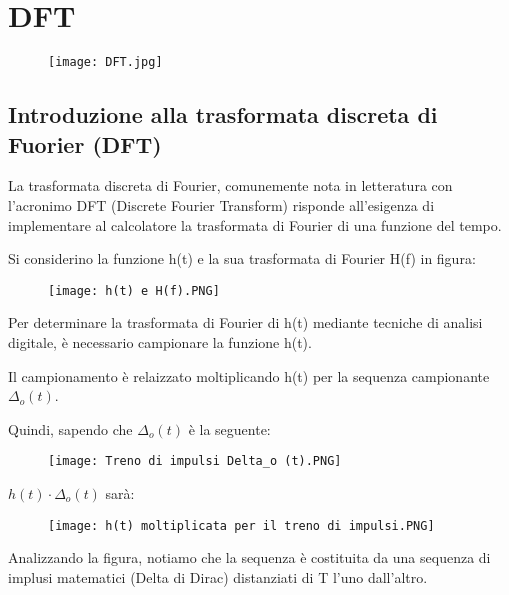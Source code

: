 \chapter{DFT} 

\begin{figure}[h]
    \centering
    \texttt{[image: DFT.jpg]}
\end{figure}  

\newpage 

\section{Introduzione alla trasformata discreta di Fuorier (DFT)}

La trasformata discreta di Fourier, comunemente nota in letteratura con l'acronimo DFT (Discrete Fourier Transform) 
risponde all'esigenza di implementare al calcolatore la trasformata di Fourier di una funzione del tempo. \newline 

Si considerino la funzione h(t) e la sua trasformata di Fourier H(f) in figura: 

\begin{figure}[h]
    \centering
    \texttt{[image: h(t) e H(f).PNG]}
\end{figure} 

Per determinare la trasformata di Fourier di h(t) mediante tecniche di analisi digitale, 
è necessario campionare la funzione h(t). \newline 

Il campionamento è relaizzato moltiplicando h(t) per la sequenza campionante $\Delta_o (t)$. \newline 

Quindi, sapendo che $\Delta_o (t)$ è la seguente: 

\begin{figure}[h]
    \centering
    \texttt{[image: Treno di impulsi Delta\_o (t).PNG]}
\end{figure} 

$h(t) \cdot \Delta_o (t)$ sarà: 


\begin{figure}[h]
    \centering
    \texttt{[image: h(t) moltiplicata per il treno di impulsi.PNG]}
\end{figure} 

Analizzando la figura, notiamo che la sequenza è costituita da una sequenza di implusi matematici (Delta di Dirac) 
distanziati di T l'uno dall'altro. \newline 

